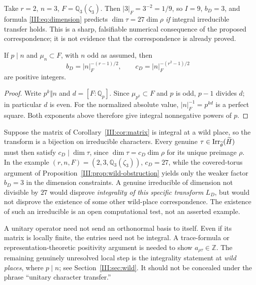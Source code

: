 \begin{remark}
Take $r=2$, $n=3$, $F=\mathbb Q_3(\zeta_3)$. Then $|3|_F=3^{-2}=1/9$, so $I=9$, $b_D=3$, and formula \eqref{III:eq:dimension} predicts $\dim\tau=27\dim\rho$ \emph{if} integral irreducible transfer holds. This is a sharp, falsifiable numerical consequence of the proposed correspondence; it is not evidence that the correspondence is already proved.
\end{remark}


\begin{lemma}\label{III:lem:integral-constants}
If $p\mid n$ and $\mu_n\subset F$, with $n$ odd as assumed, then
\[
b_D=|n|_F^{-(r-1)/2},\qquad
c_D=|n|_F^{-(r^2-1)/2}
\]
are positive integers.
\end{lemma}
\begin{proof}
Write $p^k\Vert n$ and $d=[F:\mathbb Q_p]$. Since
$\mu_{p^k}\subset F$ and $p$ is odd, $p-1$ divides $d$;
in particular $d$ is even. For the normalized absolute value,
$|n|_F^{-1}=p^{kd}$ is a perfect square. Both exponents above
therefore give integral nonnegative powers of $p$.
\end{proof}

\begin{remark}\label{III:rem:wild-test}
Suppose the matrix of Corollary~\ref{III:cor:matrix} is integral at a
wild place, so the transform is a bijection on irreducible characters.
Every genuine $\tau\in\operatorname{Irr}_{\widetilde\theta}(\widetilde H)$ must then satisfy
$c_D\mid\dim\tau$, since $\dim\tau=c_D\dim\rho$ for its unique
preimage $\rho$. In the example $(r,n,F)=(2,3,\mathbb Q_3(\zeta_3))$,
$c_D=27$, while the covered-torus argument of
Proposition~\ref{III:prop:wild-obstruction} yields only the weaker
factor $b_D=3$ in the dimension constraints. A genuine irreducible
of dimension not divisible by $27$ would disprove \emph{integrality
of this specific transform} $L_D$, but would not disprove the existence
of some other wild-place correspondence. The existence of such an
irreducible is an open computational test, not an asserted example.
\end{remark}

\begin{remark}\label{III:rem:warning}
A unitary operator need not send an orthonormal basis to itself. Even if its matrix is locally finite, the entries need not be integral. A trace-formula or representation-theoretic positivity argument is needed to show $a_{\rho\tau}\in\mathbb Z$. The remaining genuinely unresolved local step is the integrality statement at \emph{wild places}, where $p\mid n$; see Section~\ref{III:sec:wild}. It should not be concealed under the phrase ``unitary character transfer.''
\end{remark}

